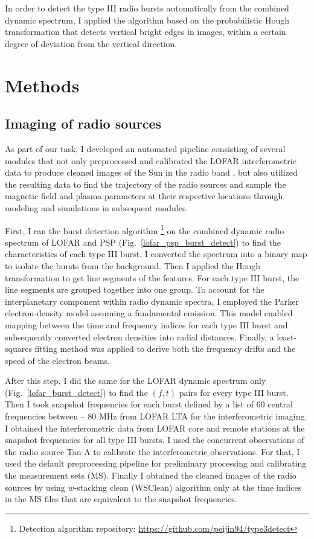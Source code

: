 In order to detect the type III radio bursts automatically from the combined dynamic spectrum, I applied the \citet{zhang_2018} algorithm  based on the probabilistic Hough transformation that detects vertical bright edges in images, within a certain degree of deviation from the vertical direction.

\section{Methods}
\label{sec_ch3_methods}
\subsection{Imaging of radio sources}
As part of our task, I developed an automated pipeline consisting of several modules that not only preprocessed and calibrated the LOFAR interferometric data to produce cleaned images of the Sun in the radio band \citep{zhang_radio_2022}, but also utilized the resulting data to find the trajectory of the radio sources and sample the magnetic field and plasma parameters at their respective locations through modeling and simulations in subsequent modules.

First, I ran the burst detection algorithm \citep{zhang_2018} \footnote{Detection algorithm repository: \url{https://github.com/peijin94/type3detect}} on the combined dynamic radio spectrum of LOFAR and PSP (Fig.~\ref{lofar_psp_burst_detect}) to find the characteristics of each type III burst. I converted the spectrum into a binary map to isolate the bursts from the background. Then I applied the Hough transformation to get line segments of the features. For each type III burst, the line segments are grouped together into one group. To account for the interplanetary component within radio dynamic spectra, I employed the Parker electron-density model \citep{parker_1960} assuming a fundamental emission. This model enabled mapping between the time and frequency indices for each type III burst and subsequently converted electron densities into radial distances. Finally, a least-squares fitting method was applied to derive both the frequency drifts and the speed of the electron beams.

After this step, I did the same for the LOFAR dynamic spectrum only (Fig.~\ref{lofar_burst_detect}) to find the $(f,t)$ pairs for every type III burst. Then I took snapshot frequencies for each burst defined by a list of 60 central frequencies between  -- 80 MHz from LOFAR LTA for the interferometric imaging. I obtained the interferometric data from LOFAR core and remote stations at the snapshot frequencies for all type III bursts. I used the concurrent observations of the radio source Tau-A  to calibrate the interferometric observations. For that, I used the default preprocessing pipeline \citep[DP3]{dppp_2018} for preliminary processing and calibrating the measurement sets (MS). Finally I obtained the cleaned images of the radio sources by using $w$-stacking clean (WSClean) algorithm \citep{wsclean_2014} only at  the time indices in the MS files that are equivalent to the snapshot frequencies.

